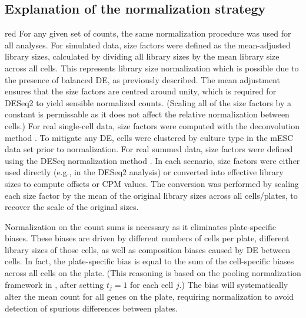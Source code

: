 \documentclass{article}
\begin{document}
\subsection{Explanation of the normalization strategy}
\begin{color}{red}
For any given set of counts, the same normalization procedure was used for all analyses.
For simulated data, size factors were defined as the mean-adjusted library sizes, calculated by dividing all library sizes by the mean library size across all cells.
This represents library size normalization which is possible due to the presence of balanced DE, as previously described.
The mean adjustment ensures that the size factors are centred around unity, which is required for DESeq2 to yield sensible normalized counts.
(Scaling all of the size factors by a constant is permissable as it does not affect the relative normalization between cells.)
For real single-cell data, size factors were computed with the deconvolution method \citep{lun2016pooling}.
To mitigate any DE, cells were clustered by culture type in the mESC data set prior to normalization.
For real summed data, size factors were defined using the DESeq normalization method \citep{anders2010differential}.
In each scenario, size factors were either used directly (e.g., in the DESeq2 analysis) or converted into effective library sizes to compute offsets or CPM values.
The conversion was performed by scaling each size factor by the mean of the original library sizes across all cells/plates, to recover the scale of the original sizes.

Normalization on the count sums is necessary as it eliminates plate-specific biases.
These biases are driven by different numbers of cells per plate, different library sizes of those cells, as well as composition biases caused by DE between cells.
In fact, the plate-specific bias is equal to the sum of the cell-specific biases across all cells on the plate.
(This reasoning is based on the pooling normalization framework in \cite{lun2016pooling}, after setting $t_j=1$ for each cell $j$.)
The bias will systematically alter the mean count for all genes on the plate, requiring normalization to avoid detection of spurious differences between plates.
\end{color}
\end{document}
